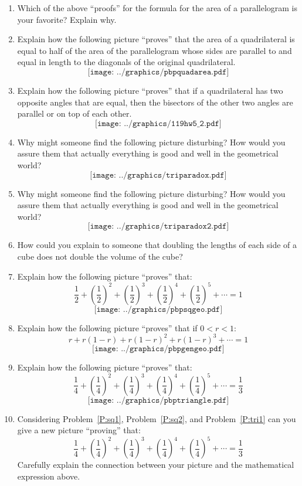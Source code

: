 \begin{problems}
\begin{enumerate}
\item Which of the above ``proofs'' for the formula for the area of a
  parallelogram is your favorite? Explain why.

\item Explain how the following picture ``proves'' that the area of a
  quadrilateral is equal to half of the area of the parallelogram
  whose sides are parallel to and equal in length to the diagonals of
  the original quadrilateral.
\[
\texttt{[image: ../graphics/pbpquadarea.pdf]}
\]

\item Explain how the following picture ``proves'' that if a
  quadrilateral has two opposite angles that are equal, then the
  bisectors of the other two angles are parallel or on top of each
  other.
\[
\texttt{[image: ../graphics/119hw5\_2.pdf]}
\]


\break

\item\label{P:Tparadox1} Why might someone find the following picture
  disturbing? How would you assure them that actually everything is
  good and well in the geometrical world?
\[
\texttt{[image: ../graphics/triparadox.pdf]}
\]


\item\label{P:Tparadox2} Why might someone find the following picture
  disturbing? How would you assure them that actually everything is
  good and well in the geometrical world?
\[
\texttt{[image: ../graphics/triparadox2.pdf]}
\]


\item How could you explain to someone that doubling the lengths of each side of a cube does not double the volume of the cube?

\item\label{P:sq1}  Explain how the following picture ``proves'' that:
\[
\frac{1}{2} + \left(\frac{1}{2}\right)^2 +  \left(\frac{1}{2}\right)^3 +  \left(\frac{1}{2}\right)^4 +  \left(\frac{1}{2}\right)^5 + \cdots = 1
\]
\[
\texttt{[image: ../graphics/pbpsqgeo.pdf]}
\]
\item\label{P:sq2}  Explain how the following picture ``proves'' that if $0 < r < 1$:
\[
r + r(1-r) + r(1-r)^2 + r(1-r)^3 + \cdots = 1
\]
\[
\texttt{[image: ../graphics/pbpgengeo.pdf]}
\]
\item\label{P:tri1} Explain how the following picture ``proves'' that:
\[
\frac{1}{4} + \left(\frac{1}{4}\right)^2 +  \left(\frac{1}{4}\right)^3 +  \left(\frac{1}{4}\right)^4 +  \left(\frac{1}{4}\right)^5 + \cdots = \frac{1}{3}
\]
\[
\texttt{[image: ../graphics/pbptriangle.pdf]}
\]
\item Considering Problem~\ref{P:sq1}, Problem~\ref{P:sq2}, and
  Problem~\ref{P:tri1} can you give a new picture ``proving'' that: 
\[
\frac{1}{4} + \left(\frac{1}{4}\right)^2 +  \left(\frac{1}{4}\right)^3 +  \left(\frac{1}{4}\right)^4 +  \left(\frac{1}{4}\right)^5 + \cdots = \frac{1}{3}
\]
Carefully explain the connection between your picture and the
mathematical expression above.


\end{enumerate}
\end{problems}
